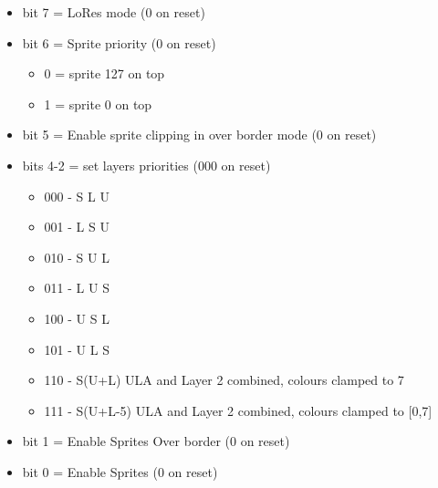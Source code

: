 \begin{itemize}
\item bit 7 = LoRes mode (0 on reset)
\item bit 6 = Sprite priority (0 on reset)
\begin{itemize}
\item 0 = sprite 127 on top
\item 1 = sprite 0 on top
\end{itemize}
\item bit 5 = Enable sprite clipping in over border mode (0 on reset)
\item bits 4-2 = set layers priorities (000 on reset)
  \begin{itemize}
  \item 000 - S L U
  \item 001 - L S U
  \item 010 - S U L
  \item 011 - L U S
  \item 100 - U S L
  \item 101 - U L S
  \item 110 - S(U+L) ULA and Layer 2 combined, colours clamped to 7
  \item 111 - S(U+L-5) ULA and Layer 2 combined, colours clamped to [0,7]
  \end{itemize}
\item bit 1 = Enable Sprites Over border (0 on reset)
\item bit 0 = Enable Sprites (0 on reset)
\end{itemize}

